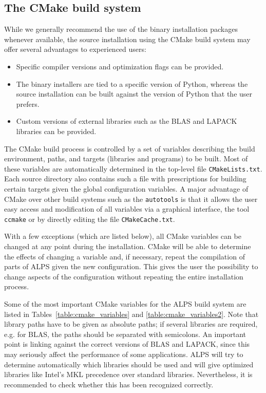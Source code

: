 \documentclass[12pt]{iopart}
\begin{document}
\subsection{The CMake build system}

While we generally recommend the use of the binary installation packages whenever available, the source installation using the CMake build system may offer several advantages to experienced users:
\begin{itemize}
\item Specific compiler versions and optimization flags can be provided.
\item The binary installers are tied to a specific version of Python, whereas the source installation can be built against the version of Python that the user prefers.
\item Custom versions of external libraries such as the BLAS and LAPACK libraries can be provided.
\end{itemize}

The CMake build process is controlled by a set of variables describing the build environment, paths, and targets (libraries and programs) to be built. Most of these variables are automatically determined in the top-level file {\tt CMakeLists.txt}. Each source directory also contains such a file with prescriptions for building certain targets given the global configuration variables. A major advantage of CMake over other build systems such as the {\tt autotools} is that it allows the user easy access and modification of all variables via a graphical interface, the tool {\tt ccmake} or by directly editing the file {\tt CMakeCache.txt}.

With a few exceptions (which are listed below), all CMake variables can be changed at any point during the installation. CMake will be able to determine the effects of changing a variable and, if necessary, repeat the compilation of parts of ALPS given the new configuration. This gives the user the possibility to change aspects of the configuration without repeating the entire installation process.

Some of the most important CMake variables for the ALPS build system are listed in Tables~\ref{table:cmake_variables} and \ref{table:cmake_variables2}. Note that library paths have to be given as absolute paths; if several libraries are required, e.g. for BLAS, the paths should be separated with semicolons. An important point is linking against the correct versions of BLAS and LAPACK, since this may seriously affect the performance of some applications. ALPS will try to determine automatically which libraries should be used and will give optimized libraries like Intel's MKL precedence over standard libraries. Nevertheless, it is recommended to check whether this has been recognized correctly.
\end{document}
